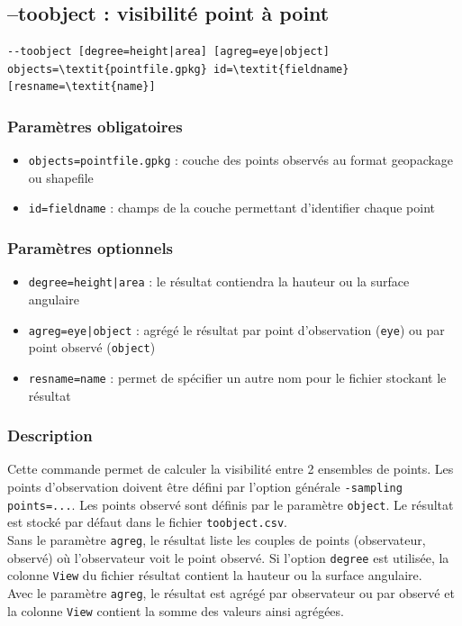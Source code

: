 \documentclass{report}
\begin{document}
\subsection{--toobject : visibilité point à point}
\begin{Verbatim}[commandchars=\\\{\}]
--toobject [degree=height|area] [agreg=eye|object] objects=\textit{pointfile.gpkg} id=\textit{fieldname} [resname=\textit{name}]
\end{Verbatim}

\subsubsection{Paramètres obligatoires}
\begin{itemize}
	\item \verb|objects=pointfile.gpkg| : couche des points observés au format geopackage ou shapefile
	\item \verb|id=fieldname| : champs de la couche permettant d'identifier chaque point
\end{itemize}

\subsubsection{Paramètres optionnels}
\begin{itemize}
	\item \verb/degree=height|area/ : le résultat contiendra la hauteur ou la surface angulaire
	\item \verb/agreg=eye|object/ : agrégé le résultat par point d'observation (\verb|eye|) ou par point observé (\verb|object|)
	\item \verb|resname=name| : permet de spécifier un autre nom pour le fichier stockant le résultat	
\end{itemize}

\subsubsection{Description}
Cette commande permet de calculer la visibilité entre 2 ensembles de points. Les points d'observation doivent être défini par l'option générale \verb|-sampling points=...|. Les points observé sont définis par le paramètre \verb|object|. Le résultat est stocké par défaut dans le fichier \verb|toobject.csv|.\\
Sans le paramètre \verb|agreg|, le résultat liste les couples de points (observateur, observé) où l'observateur voit le point observé. Si l'option \verb|degree| est utilisée, la colonne \verb|View| du fichier résultat contient la hauteur ou la surface angulaire.\\
Avec le paramètre \verb|agreg|, le résultat est agrégé par observateur ou par observé et la colonne \verb|View| contient la somme des valeurs ainsi agrégées.
\end{document}
